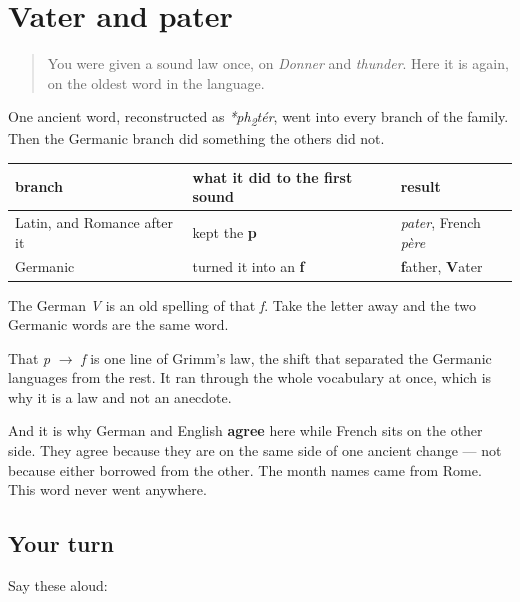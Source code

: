 \section[Vater und pater]{Vater and pater}

\label{lesson:GE-C10-vater-pater}



\begin{quote}
You were given a sound law once, on \emph{Donner} and \emph{thunder}. Here it is again, on the oldest word in the language.
\end{quote}

\begin{cousinweb}
One ancient word, reconstructed as \emph{*ph\textsubscript{2}tér}, went into every branch of the family. Then the Germanic branch did something the others did not.

\noindent
\begin{tabularx}{\linewidth}{@{}>{\raggedright\arraybackslash}X>{\raggedright\arraybackslash}X>{\raggedright\arraybackslash}X@{}}
\toprule
\textbf{branch} & \textbf{what it did to the first sound} & \textbf{result} \\
\midrule
Latin, and Romance after it & kept the \textbf{p} & \emph{pater}, French \emph{père} \\
Germanic & turned it into an \textbf{f} & \textbf{f}ather, \textbf{V}ater \\
\bottomrule
\end{tabularx}

The German \emph{V} is an old spelling of that \emph{f}. Take the letter away and the two Germanic words are the same word.
\end{cousinweb}

\begin{culture}
That \emph{p} $\to$ \emph{f} is one line of Grimm's law, the shift that separated the Germanic languages from the rest. It ran through the whole vocabulary at once, which is why it is a law and not an anecdote.

And it is why German and English \textbf{agree} here while French sits on the other side. They agree because they are on the same side of one ancient change — not because either borrowed from the other. The month names came from Rome. This word never went anywhere.
\end{culture}

\subsection*{Your turn}
Say these aloud:

